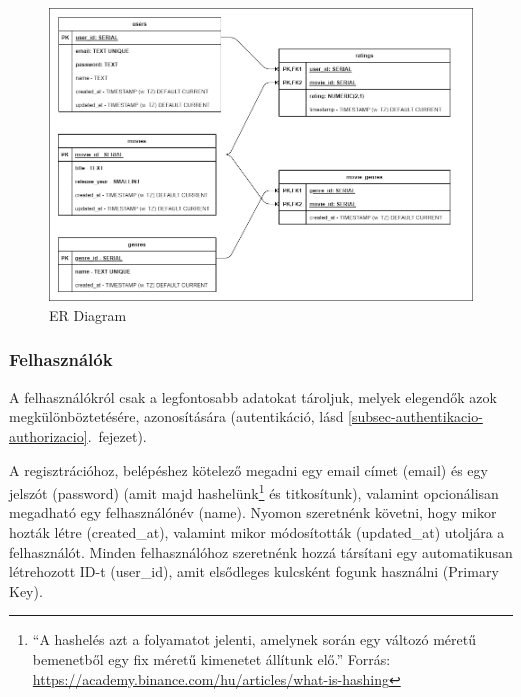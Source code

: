 \documentclass[
]{thesis-ekf}
\theoremstyle{definition}
\theoremstyle{remark}
\begin{document}
\begin{figure}[H]
	\centering
	\includegraphics[width=14cm]{images/er-diagram.png}
	\caption[ER Diagram]{ER Diagram}
	\label{fig-er-diagram}
\end{figure}

\subsubsection{Felhasználók}
A felhasználókról csak a legfontosabb adatokat tároljuk, melyek elegendők azok megkülönböztetésére, azonosítására (autentikáció, lásd \ref{subsec-authentikacio-authorizacio}.~fejezet).

A regisztrációhoz, belépéshez kötelező megadni egy email címet (email) és egy jelszót (password) (amit majd hashelünk\footnote{``A hashelés azt a folyamatot jelenti, amelynek során egy változó méretű bemenetből egy fix méretű kimenetet állítunk elő.'' Forrás: \url{https://academy.binance.com/hu/articles/what-is-hashing}} és titkosítunk), valamint opcionálisan megadható egy felhasználónév (name). Nyomon szeretnénk követni, hogy mikor hozták létre (created\_at), valamint mikor módosították (updated\_at) utoljára a felhasználót. Minden felhasználóhoz szeretnénk hozzá társítani egy automatikusan létrehozott ID-t (user\_id), amit elsődleges kulcsként fogunk használni (Primary Key).
\end{document}
